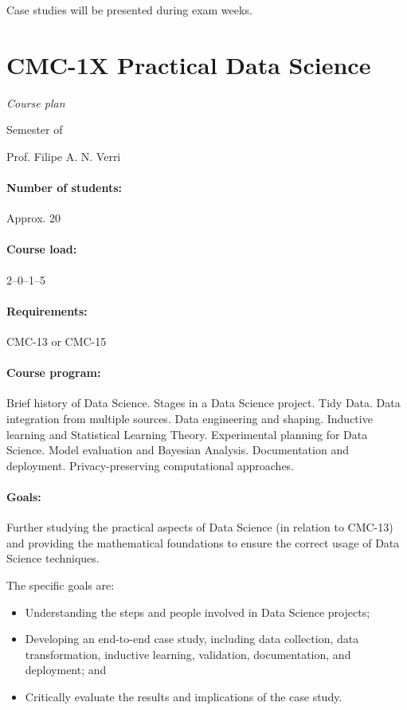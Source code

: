Case studies will be presented during exam weeks.

\newpage
{}
\thispagestyle{empty}
\section*{CMC-1X Practical Data Science}

\emph{Course plan}

 Semester of \the\year{}

Prof. Filipe A. N. Verri

\paragraph{Number of students:} Approx. 20

\paragraph{Course load:} 2--0--1--5

\paragraph{Requirements:} CMC-13 or CMC-15

\paragraph{Course program:}
Brief history of Data Science. Stages in a Data Science project. Tidy Data. Data
integration from multiple sources. Data engineering and shaping. Inductive learning and
Statistical Learning Theory. Experimental planning for Data Science. Model evaluation and
Bayesian Analysis. Documentation and deployment. Privacy-preserving computational
approaches.

\paragraph{Goals:}
Further studying the practical aspects of Data Science (in relation to CMC-13) and providing
the mathematical foundations to ensure the correct usage of Data Science techniques.

The specific goals are:
\begin{itemize}
  \item Understanding the steps and people involved in Data Science projects;
  \item Developing an end-to-end case study, including data collection, data transformation,
    inductive learning, validation, documentation, and deployment; and
  \item Critically evaluate the results and implications of the case study.
\end{itemize}

